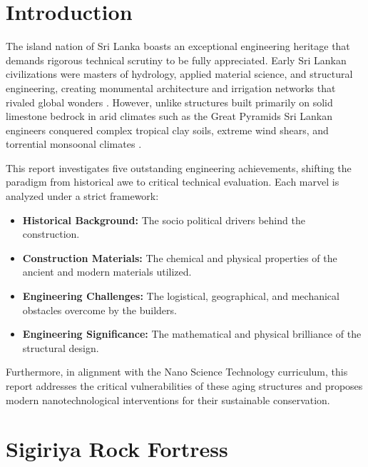 \documentclass[12pt,a4paper]{report}
\begin{document}
	\newpage
	\tableofcontents
	\newpage
	\listoffigures
	\newpage
	\listoftables
	\newpage
	
	\setcounter{page}{1}
	\onehalfspacing
	


	\chapter{Introduction}
	The island nation of Sri Lanka boasts an exceptional engineering heritage that demands rigorous technical scrutiny to be fully appreciated. Early Sri Lankan civilizations were masters of hydrology, applied material science, and structural engineering, creating monumental architecture and irrigation networks that rivaled global wonders \cite{wijesuriya1998}. However, unlike structures built primarily on solid limestone bedrock in arid climates such as the Great Pyramids Sri Lankan engineers conquered complex tropical clay soils, extreme wind shears, and torrential monsoonal climates \cite{cooray1984}. 
	
	This report investigates five outstanding engineering achievements, shifting the paradigm from historical awe to critical technical evaluation. Each marvel is analyzed under a strict framework:
	\begin{itemize}
		\item \textbf{Historical Background:} The socio political drivers behind the construction.
		\item \textbf{Construction Materials:} The chemical and physical properties of the ancient and modern materials utilized.
		\item \textbf{Engineering Challenges:} The logistical, geographical, and mechanical obstacles overcome by the builders.
		\item \textbf{Engineering Significance:} The mathematical and physical brilliance of the structural design.
	\end{itemize}
	
	Furthermore, in alignment with the Nano Science Technology curriculum, this report addresses the critical vulnerabilities of these aging structures and proposes modern nanotechnological interventions for their sustainable conservation.
	


	\chapter{Sigiriya Rock Fortress}
	
\end{document}
